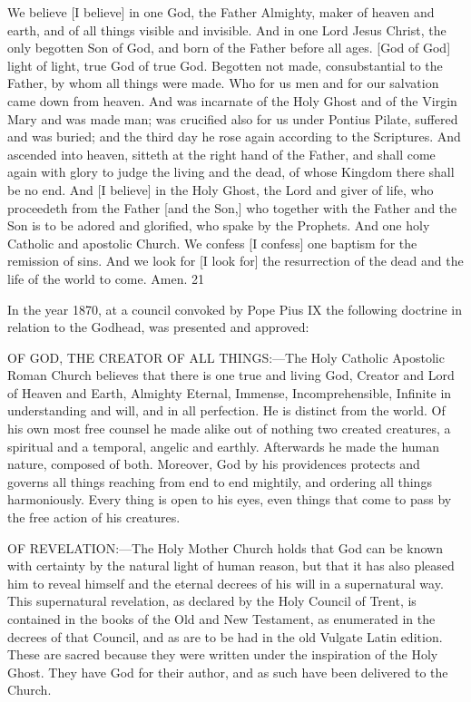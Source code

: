 We believe [I believe] in one God, the Father Almighty, maker of heaven and earth, and of
all things visible and invisible. And in one Lord Jesus Christ, the only begotten Son of God,
and born of the Father before all ages. [God of God] light of light, true God of true God.
Begotten not made, consubstantial to the Father, by whom all things were made. Who for us
men and for our salvation came down from heaven. And was incarnate of the Holy Ghost and
of the Virgin Mary and was made man; was crucified also for us under Pontius Pilate,
suffered and was buried; and the third day he rose again according to the Scriptures. And
ascended into heaven, sitteth at the right hand of the Father, and shall come again with glory
to judge the living and the dead, of whose Kingdom there shall be no end. And [I believe] in
the Holy Ghost, the Lord and giver of life, who proceedeth from the Father [and the Son,]
who together with the Father and the Son is to be adored and glorified, who spake by the
Prophets. And one holy Catholic and apostolic Church. We confess [I confess] one baptism
for the remission of sins. And we look for [I look for] the resurrection of the dead and the life
of the world to come. Amen. 21

In the year 1870, at a council convoked by Pope Pius IX the following doctrine in relation to
the Godhead, was presented and approved:

OF GOD, THE CREATOR OF ALL THINGS:—The Holy Catholic Apostolic Roman
Church believes that there is one true and living God, Creator and Lord of Heaven and Earth,
Almighty Eternal, Immense, Incomprehensible, Infinite in understanding and will, and in all
perfection. He is distinct from the world. Of his own most free counsel he made alike out of
nothing two created creatures, a spiritual and a temporal, angelic and earthly. Afterwards he
made the human nature, composed of both. Moreover, God by his providences protects and
governs all things reaching from end to end mightily, and ordering all things harmoniously.
Every thing is open to his eyes, even things that come to pass by the free action of his
creatures.

OF REVELATION:—The Holy Mother Church holds that God can be known with certainty
by the natural light of human reason, but that it has also pleased him to reveal himself and the
eternal decrees of his will in a supernatural way. This supernatural revelation, as declared by
the Holy Council of Trent, is contained in the books of the Old and New Testament, as
enumerated in the decrees of that Council, and as are to be had in the old Vulgate Latin
edition. These are sacred because they were written under the inspiration of the Holy Ghost.
They have God for their author, and as such have been delivered to the Church.

